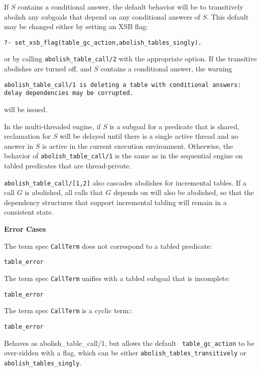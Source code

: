 \begin{description}
\begin{description}
If $S$ contains a conditional answer, the default behavior will be to
transitively abolish any subgoals that depend on any conditional
answers of $S$.  This default may be changed either by setting an XSB
flag:
%
\begin{verbatim}
?- set_xsb_flag(table_gc_action,abolish_tables_singly).
\end{verbatim}
% 
or by calling {\tt abolish\_table\_call/2} with the appropriate
option.  If the transitive abolishes are turned off, and $S$ contains
a conditional answer, the warning

{\tt abolish\_table\_call/1 is deleting a table with
  conditional\ answers: \\ delay dependencies may be corrupted.}

will be issued.  

In the multi-threaded engine, if $S$ is a subgoal for a predicate that
is shared, reclamation for $S$ will be delayed until there is a single
active thread and no answer in $S$ is active in the current execution
environment.  Otherwise, the behavior of {\tt abolish\_table\_call/1}
is the same as in the sequential engine on tabled predicates that are
thread-private.

{\tt abolish\_table\_call/[1,2]} also cascades abolishes for
incremental tables.  If a call $G$ is abolished, all calls that $G$
depends on will also be abolished, so that the dependency structures
that support incremental tabling will remain in a consistent state.

{\bf Error Cases}
\bi
\item The term spec {\tt CallTerm} does not correspond to a tabled predicate:
\bi
\item 	{\tt table\_error}
\ei
\item The term spec {\tt CallTerm} unifies with a tabled subgoal that is incomplete:
\bi
\item 	{\tt table\_error}
\ei
\item The term spec {\tt CallTerm} is a cyclic term::
\bi
\item 	{\tt table\_error}
\ei
\ei
%

%
Behaves as {abolish\_table\_call/1}, but allows the default {\tt
  table\_gc\_action} to be over-ridden with a flag, which can be either 
{\tt abolish\_tables\_transitively} or {\tt abolish\_tables\_singly}.


\end{description}
\end{description}

